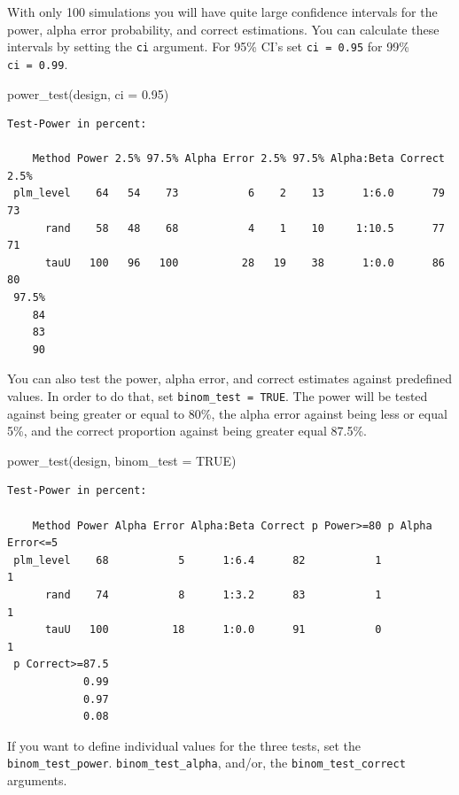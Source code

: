 \documentclass[
  letterpaper,
  DIV=11,
  numbers=noendperiod]{scrreprt}
\newenvironment{Shaded}{\begin{snugshade}}{\end{snugshade}}
\newcommand{\AttributeTok}[1]{\textcolor[rgb]{0.40,0.45,0.13}{#1}}
\newcommand{\ConstantTok}[1]{\textcolor[rgb]{0.56,0.35,0.01}{#1}}
\newcommand{\FloatTok}[1]{\textcolor[rgb]{0.68,0.00,0.00}{#1}}
\newcommand{\FunctionTok}[1]{\textcolor[rgb]{0.28,0.35,0.67}{#1}}
\newcommand{\NormalTok}[1]{\textcolor[rgb]{0.00,0.23,0.31}{#1}}
\begin{document}
With only 100 simulations you will have quite large confidence intervals
for the power, alpha error probability, and correct estimations. You can
calculate these intervals by setting the \texttt{ci} argument. For 95\%
CI's set \texttt{ci\ =\ 0.95} for 99\% \texttt{ci\ =\ 0.99}.

\begin{Shaded}
\begin{Highlighting}[]
\FunctionTok{power\_test}\NormalTok{(design, }\AttributeTok{ci =} \FloatTok{0.95}\NormalTok{)}
\end{Highlighting}
\end{Shaded}

\begin{verbatim}
Test-Power in percent:

    Method Power 2.5% 97.5% Alpha Error 2.5% 97.5% Alpha:Beta Correct 2.5%
 plm_level    64   54    73           6    2    13      1:6.0      79   73
      rand    58   48    68           4    1    10     1:10.5      77   71
      tauU   100   96   100          28   19    38      1:0.0      86   80
 97.5%
    84
    83
    90
\end{verbatim}

You can also test the power, alpha error, and correct estimates against
predefined values. In order to do that, set
\texttt{binom\_test\ =\ TRUE}. The power will be tested against being
greater or equal to 80\%, the alpha error against being less or equal
5\%, and the correct proportion against being greater equal 87.5\%.

\begin{Shaded}
\begin{Highlighting}[]
\FunctionTok{power\_test}\NormalTok{(design, }\AttributeTok{binom\_test =} \ConstantTok{TRUE}\NormalTok{)}
\end{Highlighting}
\end{Shaded}

\begin{verbatim}
Test-Power in percent:

    Method Power Alpha Error Alpha:Beta Correct p Power>=80 p Alpha Error<=5
 plm_level    68           5      1:6.4      82           1                1
      rand    74           8      1:3.2      83           1                1
      tauU   100          18      1:0.0      91           0                1
 p Correct>=87.5
            0.99
            0.97
            0.08
\end{verbatim}

If you want to define individual values for the three tests, set the
\texttt{binom\_test\_power}. \texttt{binom\_test\_alpha}, and/or, the
\texttt{binom\_test\_correct} arguments.
\end{document}
